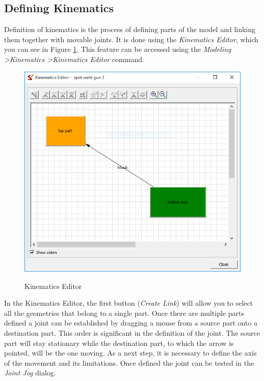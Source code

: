 \subsection{Defining Kinematics}
Definition of kinematics is the process of defining parts of the model and linking them together with movable joints.
It is done using the \emph{Kinematics Editor}, which you can see in Figure \ref{fig:KinematicsEditor}. This feature can be accessed using the \emph{Modeling \textgreater Kinematics \textgreater Kinematics Editor} command. \\

\begin{figure}[H]
    \caption{Kinematics Editor}
    \centering
    \includegraphics{kinematics_editor}
    \label{fig:KinematicsEditor}
\end{figure}

In the Kinematics Editor, the first button (\emph{Create Link}) will allow you to select all the geometries that belong to a single part.
Once there are multiple parts defined a joint can be established by dragging a mouse from a source part onto a destination part.
This order is significant in the definition of the joint. 
The source part will stay stationary while the destination part, to which the arrow is pointed, will be the one moving.
As a next step, it is necessary to define the axis of the movement and its limitations.
Once defined the joint can be tested in the \emph{Joint Jog} dialog. \\


